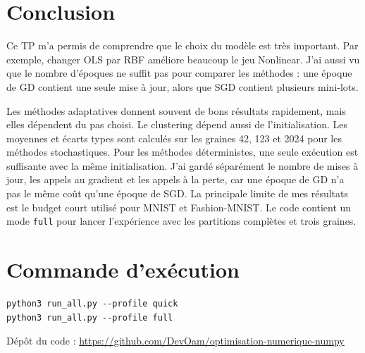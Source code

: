 \documentclass[11pt,a4paper]{article}
\begin{document}
\section{Conclusion}
Ce TP m'a permis de comprendre que le choix du modèle est très important. Par
exemple, changer OLS par RBF améliore beaucoup le jeu Nonlinear. J'ai aussi vu
que le nombre d'époques ne suffit pas pour comparer les méthodes : une époque
de GD contient une seule mise à jour, alors que SGD contient plusieurs
mini-lots.

Les méthodes adaptatives donnent souvent de bons résultats rapidement, mais
elles dépendent du pas choisi. Le clustering dépend aussi de l'initialisation.
Les moyennes et écarts types sont calculés sur les graines 42, 123 et 2024 pour
les méthodes stochastiques. Pour les méthodes déterministes, une seule exécution
est suffisante avec la même initialisation. J'ai gardé séparément le nombre de
mises à jour, les appels au gradient et les appels à la perte, car une époque de
GD n'a pas le même coût qu'une époque de SGD.
La principale limite de mes résultats est le budget court utilisé pour MNIST et
Fashion-MNIST. Le code contient un mode \texttt{full} pour lancer l'expérience
avec les partitions complètes et trois graines.

\section*{Commande d'exécution}
\begin{verbatim}
python3 run_all.py --profile quick
python3 run_all.py --profile full
\end{verbatim}

\noindent Dépôt du code :
\url{https://github.com/DevOam/optimisation-numerique-numpy}
\end{document}
